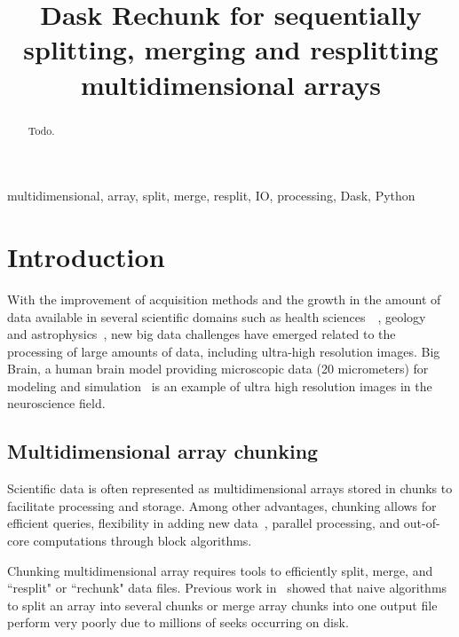 \documentclass[conference]{IEEEtran}
\begin{document}
\title{ Dask Rechunk for sequentially splitting, merging and resplitting multidimensional arrays }

\author{
}

\maketitle

\begin{abstract}
Todo.
\end{abstract}

\begin{IEEEkeywords}
multidimensional, array, split, merge, resplit, IO, processing, Dask, Python
\end{IEEEkeywords}

\section{Introduction}
With the improvement of acquisition methods and the growth in the amount of data
available in several scientific domains such as health
sciences~\cite{bigdata_health}~\cite{Amunts1472}, geology~\cite{big_data_geology}
and astrophysics~\cite{biguniverse}, new big data challenges have emerged related
to the processing of large amounts of data, including ultra-high resolution
images. Big Brain, a human brain model providing microscopic data (20 micrometers) for
modeling and simulation~\cite{Amunts1472} is an example of ultra high resolution
images in the neuroscience field.

\subsection{Multidimensional array chunking}
Scientific data is often represented as multidimensional arrays stored in
chunks to facilitate processing and storage. Among other advantages, chunking
allows for efficient queries, flexibility in adding new
data~\cite{optimal_chuking}, parallel processing, and out-of-core
computations through block algorithms.

Chunking multidimensional array requires tools to efficiently split,
merge, and ``resplit" or ``rechunk" data files. Previous work in~\cite{seqalgorithms}
showed that naive algorithms to split an array into several chunks or merge
array chunks into one output file perform very poorly due to millions of seeks
occurring on disk.
\end{document}
